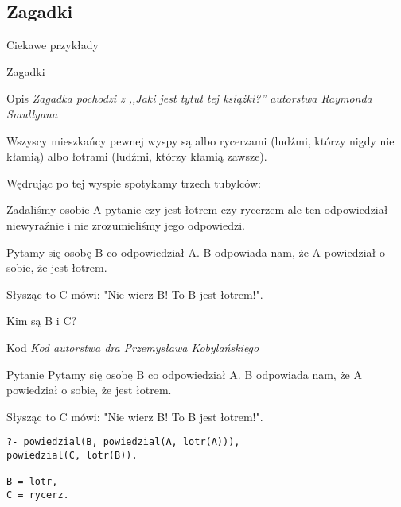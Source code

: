 \documentclass[blue]{beamer}
\newcommand{\tytulprz}[2]{\begin{frame}\begin{center}\begin{Huge}Ciekawe przykłady\end{Huge}

\hspace{20pt}

\begin{huge}#1\end{huge}

\hspace{10pt}

\begin{large}#2\end{large}\end{center}\end{frame}}
\begin{document}
\subsection{Zagadki}
\tytulprz{Zagadki}{}
\begin{frame}{Opis}
\textit{Zagadka pochodzi z ,,Jaki jest tytuł tej książki?'' autorstwa Raymonda Smullyana}

Wszyscy mieszkańcy pewnej wyspy są albo rycerzami (ludźmi, którzy nigdy nie kłamią) albo łotrami (ludźmi, którzy kłamią zawsze).

Wędrując po tej wyspie spotykamy trzech tubylców:

Zadaliśmy osobie A pytanie czy jest łotrem czy rycerzem ale ten odpowiedział niewyraźnie i nie zrozumieliśmy jego odpowiedzi.

Pytamy się osobę B co odpowiedział A. B odpowiada nam, że A powiedział o sobie, że jest łotrem.

Słysząc to C mówi: "Nie wierz B! To B jest łotrem!".

Kim są B i C?
\end{frame}
\begin{frame}{Kod}
\textit{Kod autorstwa dra Przemysława Kobylańskiego}

\end{frame}
\begin{frame}[fragile]{Pytanie}
Pytamy się osobę B co odpowiedział A. B odpowiada nam, że A powiedział o sobie, że jest łotrem.

Słysząc to C mówi: "Nie wierz B! To B jest łotrem!".
\begin{lstlisting}
?- powiedzial(B, powiedzial(A, lotr(A))),
powiedzial(C, lotr(B)).

B = lotr,
C = rycerz.
\end{lstlisting}
\end{frame}
\end{document}
